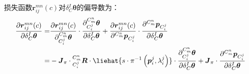 损失函数$\boldsymbol{r}_{ij}^{mn}(c)$对$\delta{^{I}_{C}\boldsymbol{\theta}}$的偏导数为：
\begin{equation}
  \begin{aligned}
    \frac{\partial \boldsymbol{r}_{ij}^{mn}(c)}{\partial \delta {^{I}_{C}\boldsymbol{\theta}}}= &
    \frac{\partial \boldsymbol{r}_{ij}^{mn}(c)}{\partial  ^{C_m^n}_{C_i^j}\boldsymbol{\theta}}\cdot
    \frac{\partial ^{C_m^n}_{C_i^j}\boldsymbol{\theta}}{\partial \delta {^{I}_{C}\boldsymbol{\theta}}}+
    \frac{\partial \boldsymbol{r}_{ij}^{mn}(c)}{\partial {^{C_m^n}\boldsymbol{p}_{C_i^j}}}\cdot
    \frac{\partial {^{C_m^n}\boldsymbol{p}_{C_i^j}}}{\partial \delta {^{I}_{C}\boldsymbol{\theta}}} \\=&
    -\boldsymbol{J}_{\pi}\cdot{{^{C_m^n}_{C_i^j}\boldsymbol{R}}\cdot\liehat{s \cdot\pi^{-1}\left(\boldsymbol{p}_i^j,\lambda_i^j\right)}}
    \cdot\frac{\partial ^{C_m^n}_{C_i^j}\boldsymbol{\theta}}{\partial \delta {^{I}_{C}\boldsymbol{\theta}}}
    +\boldsymbol{J}_{\pi}\cdot\frac{\partial {^{C_m^n}\boldsymbol{p}_{C_i^j}}}{\partial \delta {^{I}_{C}\boldsymbol{\theta}}}
  \end{aligned}
\end{equation}
